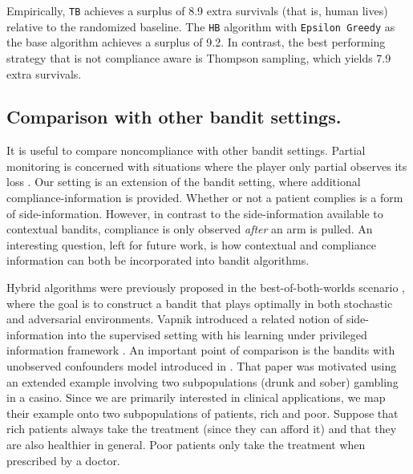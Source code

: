 Empirically, \texttt{TB} achieves a surplus of 8.9 extra survivals (that is, human lives) relative to the randomized baseline.
The \texttt{HB} algorithm with \texttt{Epsilon Greedy} as the base algorithm achieves a surplus of 9.2.
In contrast, the best performing strategy that is not compliance aware is Thompson sampling, which yields 7.9 extra survivals.



\subsection{Comparison with other bandit settings.}
It is useful to compare noncompliance with other bandit settings. Partial monitoring is concerned with situations where the player only partial observes its loss \cite{alon:15}. Our setting is an extension of the bandit setting, where additional compliance-information is provided. Whether or not a patient complies is a form of side-information. However, in contrast to the side-information available to contextual bandits, compliance is only observed \emph{after} an arm is pulled. An interesting question, left for future work, is how contextual and compliance information can both be incorporated into bandit algorithms.

Hybrid algorithms were previously proposed in the best-of-both-worlds scenario \cite{bubeck:12a,seldin:14}, where the goal is to construct a bandit that plays optimally in both stochastic and adversarial environments. Vapnik introduced a related notion of side-information into the supervised setting with his learning under privileged information framework \cite{vapnik:09}. 
An important point of comparison is the bandits with unobserved confounders model introduced in \cite{bareinboim:15}. That paper was motivated using an extended example involving two subpopulations (drunk and sober) gambling in a casino. Since we are primarily interested in clinical applications, we map their example onto two subpopulations of patients, rich and poor. Suppose that rich patients always take the treatment (since they can afford it) and that they are also healthier in general. Poor patients only take the treatment when prescribed by a doctor.

